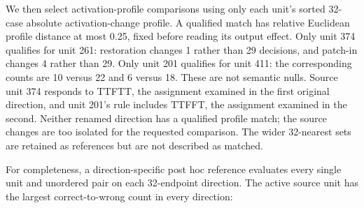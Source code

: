 \documentclass[
  british,
  11pt,
  a4paper,
]{article}
\begin{document}
We then select activation-profile comparisons using only each unit's
sorted 32-case absolute activation-change profile. A qualified match has
relative Euclidean profile distance at most 0.25, fixed before reading
its output effect. Only unit 374 qualifies for unit 261: restoration
changes 1 rather than 29 decisions, and patch-in changes 4 rather than
29. Only unit 201 qualifies for unit 411: the corresponding counts are
10 versus 22 and 6 versus 18. These are not semantic nulls. Source unit
374 responds to TTFTT, the assignment examined in the first original
direction, and unit 201's rule includes TTFFT, the assignment examined
in the second. Neither renamed direction has a qualified profile match;
the source changes are too isolated for the requested comparison. The
wider 32-nearest sets are retained as references but are not described
as matched.

For completeness, a direction-specific post hoc reference evaluates
every single unit and unordered pair on each 32-endpoint direction. The
active source unit has the largest correct-to-wrong count in every
direction:
\end{document}
